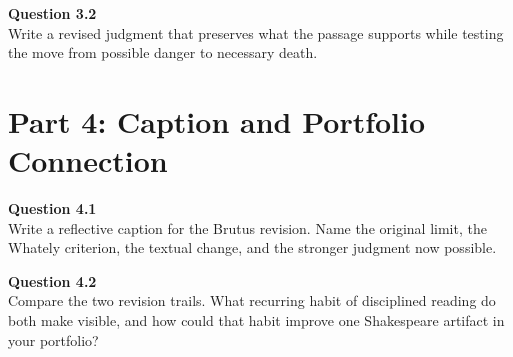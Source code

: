 \documentclass[12pt]{article}
\begin{document}
\textbf{Question 3.2}\\[-0.15em]
Write a revised judgment that preserves what the passage supports while testing the move from possible danger to necessary death.

\newpage
\section*{Part 4: Caption and Portfolio Connection}
\textbf{Question 4.1}\\[-0.15em]
Write a reflective caption for the Brutus revision. Name the original limit, the Whately criterion, the textual change, and the stronger judgment now possible.

\textbf{Question 4.2}\\[-0.15em]
Compare the two revision trails. What recurring habit of disciplined reading do both make visible, and how could that habit improve one Shakespeare artifact in your portfolio?
\end{document}
